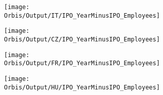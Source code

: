 \documentclass[12pt,notitlepage]{article}
\begin{document}
\begin{table}[htpb]
    \centering
    \caption{Sample Comparison - France}
    \label{tab:my_label}
\end{table}

\begin{table}[htpb]
    \centering
    \caption{Sample Comparison - Hungary}
    \label{tab:my_label}
\end{table}

\begin{table}[htpb]
    \centering
    \caption{Sample Comparison - Czech Republic}
    \label{tab:my_label}
\end{table}



\begin{figure}[htpb]
\centering
\caption{IPO and Number of Employees}
\begin{subfigure}{.49\textwidth}
    \centering
 \texttt{[image: Orbis/Output/IT/IPO\_YearMinusIPO\_Employees]}
\end{subfigure}%
\begin{subfigure}{.49\textwidth}
    \centering
 \texttt{[image: Orbis/Output/CZ/IPO\_YearMinusIPO\_Employees]}
\end{subfigure}
\begin{subfigure}{.49\textwidth}
    \centering
 \texttt{[image: Orbis/Output/FR/IPO\_YearMinusIPO\_Employees]}
\end{subfigure}%
\begin{subfigure}{.49\textwidth}
    \centering
 \texttt{[image: Orbis/Output/HU/IPO\_YearMinusIPO\_Employees]}
\end{subfigure}
\end{figure}
\end{document}
